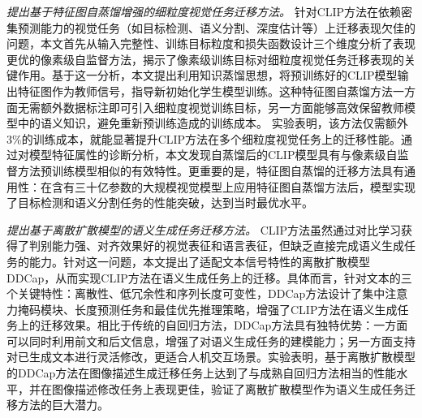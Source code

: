 \textit{提出基于特征图自蒸馏增强的细粒度视觉任务迁移方法。}
针对CLIP方法在依赖密集预测能力的视觉任务（如目标检测、语义分割、深度估计等）上迁移表现欠佳的问题，本文首先从输入完整性、训练目标粒度和损失函数设计三个维度分析了表现更优的像素级自监督方法，揭示了像素级训练目标对细粒度视觉任务迁移表现的关键作用。基于这一分析，本文提出利用知识蒸馏思想，将预训练好的CLIP模型输出特征图作为教师信号，指导新初始化学生模型训练。这种特征图自蒸馏方法一方面无需额外数据标注即可引入细粒度视觉训练目标，另一方面能够高效保留教师模型中的语义知识，避免重新预训练造成的训练成本。
实验表明，该方法仅需额外3\%的训练成本，就能显著提升CLIP方法在多个细粒度视觉任务上的迁移性能。通过对模型特征属性的诊断分析，本文发现自蒸馏后的CLIP模型具有与像素级自监督方法预训练模型相似的有效特性。更重要的是，特征图自蒸馏的迁移方法具有通用性：在含有三十亿参数的大规模视觉模型上应用特征图自蒸馏方法后，模型实现了目标检测和语义分割任务的性能突破，达到当时最优水平。

\textit{提出基于离散扩散模型的语义生成任务迁移方法。} %
CLIP方法虽然通过对比学习获得了判别能力强、对齐效果好的视觉表征和语言表征，但缺乏直接完成语义生成任务的能力。针对这一问题，本文提出了适配文本信号特性的离散扩散模型DDCap，从而实现CLIP方法在语义生成任务上的迁移。具体而言，针对文本的三个关键特性：离散性、低冗余性和序列长度可变性，DDCap方法设计了集中注意力掩码模块、长度预测任务和最佳优先推理策略，增强了CLIP方法在语义生成任务上的迁移效果。相比于传统的自回归方法，DDCap方法具有独特优势：一方面可以同时利用前文和后文信息，增强了对语义生成任务的建模能力；另一方面支持对已生成文本进行灵活修改，更适合人机交互场景。实验表明，基于离散扩散模型的DDCap方法在图像描述生成迁移任务上达到了与成熟自回归方法相当的性能水平，并在图像描述修改任务上表现更佳，验证了离散扩散模型作为语义生成任务迁移方法的巨大潜力。


